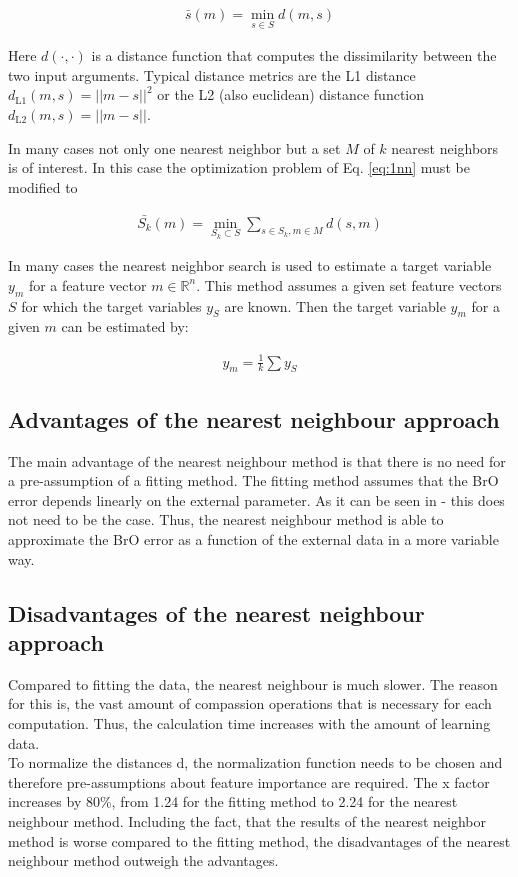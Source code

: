 \documentclass  [
  paper    = a4,
  BCOR     = 10mm,
  twoside,
  fontsize = 12pt,
  fleqn,
  toc      = bibnumbered,
  toc      = listofnumbered,
  numbers  = noendperiod,
  headings = normal,
  listof   = leveldown,
  version  = 3.03
]                                       {scrreprt}
\begin{document}
%

\begin{align}
\bar{s}(m) = \min_{s \in S} d(m, s) \label{eq:1nn}
\end{align}

%
Here $d(\cdot, \cdot)$ is a distance function that computes the dissimilarity between the two input arguments. Typical distance metrics are the L1 distance $d_{\text{L1} 	
}(m, s) = ||m - s||^2$ or the L2 (also euclidean) distance function $d_{\text{L2} 
}(m, s) = ||m - s||$. 


In many cases not only one nearest neighbor but a set $M$ of $k$ nearest neighbors is of interest. In this case the optimization problem of Eq. \ref{eq:1nn} must be modified to

%

\begin{align}
\bar{S_k}(m) = \min_{S_k \subset S} \sum_{s \in S_k, m \in M} d(s, m) \label{eq:knn}
\end{align}

%

In many cases the nearest neighbor search is used to estimate a target variable $y_m$ for a feature vector $m \in \mathbb{R}^n$. This method assumes a given set feature vectors $S$ for which the target variables $y_S$ are known. Then the target variable $y_m$ for a given $m$ can be estimated by:

%

\begin{align}
y_m = \frac{1}{k} \sum y_S \label{eq:knn_regression}
\end{align}

%

\subsection*{Advantages of the nearest neighbour approach}
	The main advantage of the nearest neighbour method is that there is no need for a pre-assumption of a fitting method. The fitting method assumes that the BrO error depends linearly  on the external parameter. As it can be seen in - this does not need to be the case. Thus, the nearest neighbour method is able to approximate the BrO error as a function of the external data in a more variable way.
%
\subsection*{Disadvantages of the nearest neighbour approach}
	Compared to fitting the data, the nearest neighbour is much slower. The reason for this is, the vast amount of compassion operations that is necessary for each computation. Thus, the calculation time increases with the amount of learning data.\\
	To normalize the distances d, the normalization function needs to be chosen and therefore pre-assumptions about feature importance are required.
	The x factor increases by 80\%, from 1.24 for the fitting method 
	to 2.24 for the nearest neighbour method.
	Including the fact, that the results of the nearest neighbor method is worse compared to the fitting method, the disadvantages of the nearest neighbour method outweigh the advantages.
\end{document}
